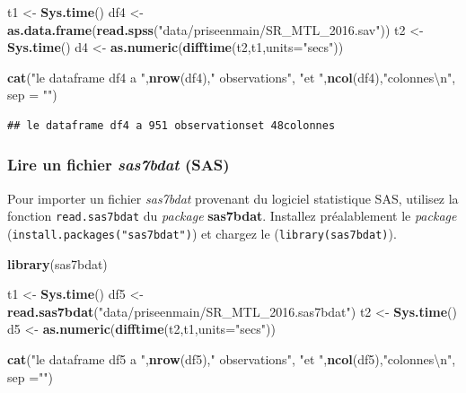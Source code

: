 \documentclass[
  11pt,
  french,
]{book}
\makeatletter
\newenvironment{Shaded}{\begin{snugshade}}{\end{snugshade}}
\newcommand{\CharTok}[1]{\textcolor[rgb]{0.31,0.60,0.02}{#1}}
\newcommand{\DataTypeTok}[1]{\textcolor[rgb]{0.13,0.29,0.53}{#1}}
\newcommand{\KeywordTok}[1]{\textcolor[rgb]{0.13,0.29,0.53}{\textbf{#1}}}
\newcommand{\NormalTok}[1]{#1}
\newcommand{\StringTok}[1]{\textcolor[rgb]{0.31,0.60,0.02}{#1}}
\newenvironment{kframe}{%
\medskip{}
\setlength{\fboxsep}{.8em}
 \def\at@end@of@kframe{}%
 \ifinner\ifhmode%
  \def\at@end@of@kframe{\end{minipage}}%
  \begin{minipage}{\columnwidth}%
 \fi\fi%
 \def\FrameCommand##1{\hskip\@totalleftmargin \hskip-\fboxsep
 \colorbox{shadecolor}{##1}\hskip-\fboxsep
     \hskip-\linewidth \hskip-\@totalleftmargin \hskip\columnwidth}%
 \MakeFramed {\advance\hsize-\width
   \@totalleftmargin\z@ \linewidth\hsize
   \@setminipage}}%
 {\par\unskip\endMakeFramed%
 \at@end@of@kframe}
\renewenvironment{Shaded}{\begin{kframe}}{\end{kframe}}
\makeatother
\begin{document}
\begin{Shaded}
\begin{Highlighting}[]
\NormalTok{t1 <-}\StringTok{ }\KeywordTok{Sys.time}\NormalTok{()}
\NormalTok{df4 <-}\StringTok{ }\KeywordTok{as.data.frame}\NormalTok{(}\KeywordTok{read.spss}\NormalTok{(}\StringTok{"data/priseenmain/SR_MTL_2016.sav"}\NormalTok{))}
\NormalTok{t2 <-}\StringTok{ }\KeywordTok{Sys.time}\NormalTok{()}
\NormalTok{d4 <-}\StringTok{ }\KeywordTok{as.numeric}\NormalTok{(}\KeywordTok{difftime}\NormalTok{(t2,t1,}\DataTypeTok{units=}\StringTok{"secs"}\NormalTok{))}

\KeywordTok{cat}\NormalTok{(}\StringTok{"le dataframe df4 a "}\NormalTok{,}\KeywordTok{nrow}\NormalTok{(df4),}\StringTok{" observations"}\NormalTok{,}
    \StringTok{"et "}\NormalTok{,}\KeywordTok{ncol}\NormalTok{(df4),}\StringTok{"colonnes}\CharTok{\textbackslash{}n}\StringTok{"}\NormalTok{, }\DataTypeTok{sep =} \StringTok{""}\NormalTok{)}
\end{Highlighting}
\end{Shaded}

\begin{verbatim}
## le dataframe df4 a 951 observationset 48colonnes
\end{verbatim}

\hypertarget{sect01415}{%
\subsubsection{\texorpdfstring{Lire un fichier \emph{sas7bdat} (SAS)}{Lire un fichier sas7bdat (SAS)}}\label{sect01415}}

Pour importer un fichier \emph{sas7bdat} provenant du logiciel statistique SAS, utilisez la fonction \texttt{read.sas7bdat} du \emph{package} \textbf{sas7bdat}. Installez préalablement le \emph{package} (\texttt{install.packages("sas7bdat")}) et chargez le (\texttt{library(sas7bdat)}).

\begin{Shaded}
\begin{Highlighting}[]
\KeywordTok{library}\NormalTok{(sas7bdat)}

\NormalTok{t1 <-}\StringTok{ }\KeywordTok{Sys.time}\NormalTok{()}
\NormalTok{df5 <-}\StringTok{ }\KeywordTok{read.sas7bdat}\NormalTok{(}\StringTok{"data/priseenmain/SR_MTL_2016.sas7bdat"}\NormalTok{)}
\NormalTok{t2 <-}\StringTok{ }\KeywordTok{Sys.time}\NormalTok{()}
\NormalTok{d5 <-}\StringTok{ }\KeywordTok{as.numeric}\NormalTok{(}\KeywordTok{difftime}\NormalTok{(t2,t1,}\DataTypeTok{units=}\StringTok{"secs"}\NormalTok{))}

\KeywordTok{cat}\NormalTok{(}\StringTok{"le dataframe df5 a "}\NormalTok{,}\KeywordTok{nrow}\NormalTok{(df5),}\StringTok{" observations"}\NormalTok{,}
    \StringTok{"et "}\NormalTok{,}\KeywordTok{ncol}\NormalTok{(df5),}\StringTok{"colonnes}\CharTok{\textbackslash{}n}\StringTok{"}\NormalTok{, }\DataTypeTok{sep =}\StringTok{""}\NormalTok{)}
\end{Highlighting}
\end{Shaded}
\end{document}
